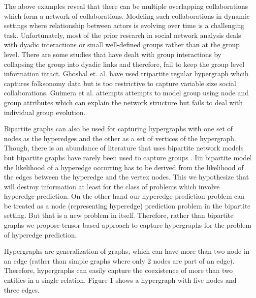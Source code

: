 \documentclass{sig-alternate}
\begin{document}
The above examples reveal that there can be multiple overlapping collaborations which form a network of collaborations. Modeling such collaborations in dynamic settings where relationship between actors is evolving over time is a challenging task. 
 Unfortunately, most of the prior research in social network analysis deals with dyadic interactions or small well-defined groups \cite{putnam1996bona} rather than at the group level. There are some studies that have dealt with group interactions by collapsing the group into dyadic links \cite{newman2001structure} and therefore, fail to keep the group level information intact. Ghoshal et. al. \cite{ghoshal2009random} have used tripartite regular hypergraph whcih captures folksonomy data but is too restrictive to capture variable size social collaborations. Guimera et al. \cite{guimera2005team} attempts attempts to model group using node and group attributes which can explain the network structure but fails to deal with individual group evolution. 

Bipartite graphs can also be used for capturing hypergraphs with one set of nodes as the hyperedges and the other as a set of vertices of the hypergraph. Though, there is an abundance of literature that uses bipartite network models \cite{clusteringdhillon}\cite{clustering2}\cite{clustering3} but bipartite graphs have rarely been used to capture groups \cite{faust1997centrality}\cite{RDF}. Iin bipartite model the likelihood of a hyperedge occurring has to be derived from the likelihood of the edges between the hyperedge and the vertex nodes.\cite{dhruv2013} This we hypothesize that will destroy information at least for the class of problems which involve hyperedge prediction. On the other hand our hyperedge prediction problem can be treated as a node (representing hyperedge) prediction problem in the bipartite setting. But that is a new problem in itself. Therefore, rather than bipartite graphs we propose tensor based approach to capture hypergraphs for the problem of hyperedge prediction. 


Hypergraphs are generalization of graphs, which can have more than two node in an edge (rather than simple graphs where only 2 nodes are part of an edge). Therefore, hypergraphs can easily capture the coexistence of more than two entities in a single relation. Figure 1 shows a hypergraph with five nodes and three edges.
\end{document}
